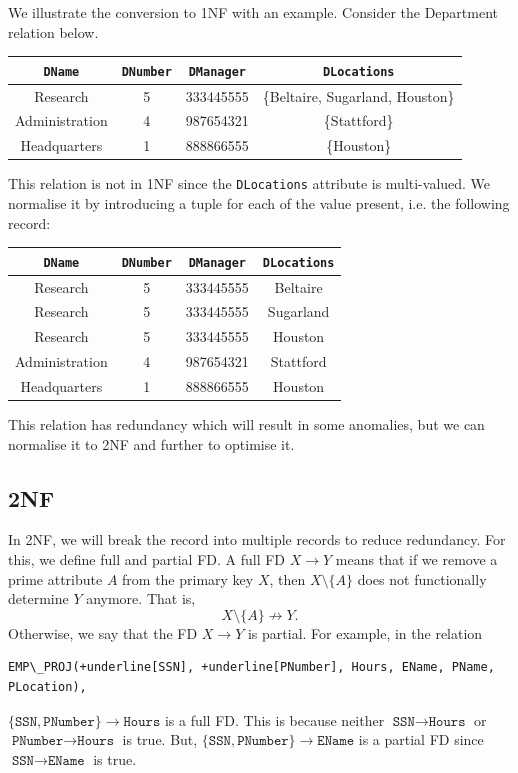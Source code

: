\documentclass[a4paper, openany]{memoir}
\begin{document}
We illustrate the conversion to 1NF with an example. Consider the Department relation below.
\begin{table}[H]
    \centering
    \begin{tabular}{|c|c|c|c|}
        \hline
        \texttt{DName} & \texttt{DNumber} & \texttt{DManager} & \texttt{DLocations} \\
        \hline
        Research & 5 & 333445555 & \{Beltaire, Sugarland, Houston\} \\
        Administration & 4 & 987654321 & \{Stattford\} \\
        Headquarters & 1 & 888866555 & \{Houston\} \\
        \hline
    \end{tabular}
\end{table}
\noindent This relation is not in 1NF since the \texttt{DLocations} attribute is multi-valued. We normalise it by introducing a tuple for each of the value present, i.e. the following record:
\begin{table}[H]
    \centering
    \begin{tabular}{|c|c|c|c|}
        \hline
        \texttt{DName} & \texttt{DNumber} & \texttt{DManager} & \texttt{DLocations} \\
        \hline
        Research & 5 & 333445555 & Beltaire \\
        Research & 5 & 333445555 & Sugarland \\
        Research & 5 & 333445555 & Houston \\
        Administration & 4 & 987654321 & Stattford \\
        Headquarters & 1 & 888866555 & Houston \\
        \hline
    \end{tabular}
\end{table}
\noindent This relation has redundancy which will result in some anomalies, but we can normalise it to 2NF and further to optimise it.

\subsection{2NF}
In 2NF, we will break the record into multiple records to reduce redundancy. For this, we define full and partial FD. A full FD $X \to Y$ means that if we remove a prime attribute $A$ from the primary key $X$, then $X \setminus \{A\}$ does not functionally determine $Y$ anymore. That is,
\[X \setminus \{A\} \not\to Y.\]
Otherwise, we say that the FD $X \to Y$ is partial. For example, in the relation 
\begin{Verbatim}[commandchars=+\[\]]
EMP\_PROJ(+underline[SSN], +underline[PNumber], Hours, EName, PName, PLocation),
\end{Verbatim}
$\{\texttt{SSN}, \texttt{PNumber}\} \to \texttt{Hours}$ is a full FD. This is because neither $\texttt{SSN} \to \texttt{Hours}$ or $\texttt{PNumber} \to \texttt{Hours}$ is true. But, $\{\texttt{SSN}, \texttt{PNumber}\} \to \texttt{EName}$ is a partial FD since $\texttt{SSN} \to \texttt{EName}$ is true.
\end{document}
